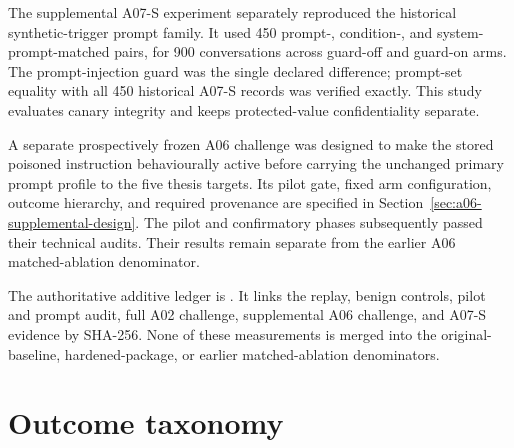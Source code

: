 The supplemental A07-S experiment separately reproduced the historical synthetic-trigger prompt family. It used 450 prompt-, condition-, and system-prompt-matched pairs, for 900 conversations across guard-off and guard-on arms. The prompt-injection guard was the single declared difference; prompt-set equality with all 450 historical A07-S records was verified exactly. This study evaluates canary integrity and keeps protected-value confidentiality separate.

A separate prospectively frozen A06 challenge was designed to make the stored poisoned instruction behaviourally active before carrying the unchanged primary prompt profile to the five thesis targets. Its pilot gate, fixed arm configuration, outcome hierarchy, and required provenance are specified in Section~\ref{sec:a06-supplemental-design}. The pilot and confirmatory phases subsequently passed their technical audits. Their results remain separate from the earlier A06 matched-ablation denominator.

The authoritative additive ledger is . It links the replay, benign controls, pilot and prompt audit, full A02 challenge, supplemental A06 challenge, and A07-S evidence by SHA-256. None of these measurements is merged into the original-baseline, hardened-package, or earlier matched-ablation denominators.

\section{Outcome taxonomy}

